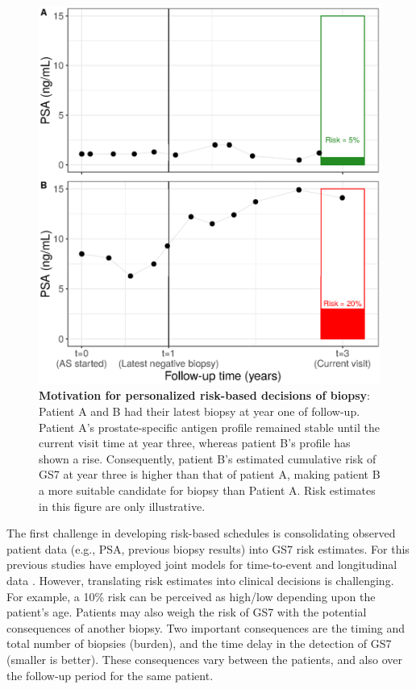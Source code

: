 \begin{figure}[!htb]
\centerline{\includegraphics[width=\columnwidth]{images/riskBasedExample.eps}}
\caption{\textbf{Motivation for personalized risk-based decisions of biopsy}: Patient A and B had their latest biopsy at year one of follow-up. Patient A's prostate-specific antigen profile remained stable until the current visit time at year three, whereas patient B's profile has shown a rise. Consequently, patient B's estimated cumulative risk of GS7 at year three is higher than that of patient A, making patient B a more suitable candidate for biopsy than Patient A. Risk estimates in this figure are only illustrative.}
\label{fig:riskBasedExample}
\end{figure}

The first challenge in developing risk-based schedules is consolidating observed patient data (e.g., PSA, previous biopsy results) into GS7 risk estimates. For this previous studies have employed joint models for time-to-event and longitudinal data \citep{tomer2019,coley2017prediction,rizopoulos2012joint}. However, translating risk estimates into clinical decisions is challenging. For example, a 10\% risk can be perceived as high/low depending upon the patient's age. Patients may also weigh the risk of GS7 with the potential consequences of another biopsy. Two important consequences are the timing and total number of biopsies (burden), and the time delay in the detection of GS7 (smaller is better). These consequences vary between the patients, and also over the follow-up period for the same patient.

